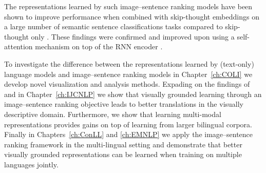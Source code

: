 
The representations learned by such image--sentence  ranking models have
been shown
to improve performance when combined with skip-thought embeddings
on a large number of semantic sentence classifications tasks compared to
skip-thought only \citep{kiela2017learning}. These findings were confirmed and improved upon using a
self-attention mechanism on top of the RNN encoder \citep{yoo2017improving}.

To investigate the difference between the representations learned by (text-only) language
models and image--sentence ranking models in Chapter~\ref{ch:COLI} we develop 
novel visualization and analysis methods.
Expading on the findings of \citep{kiela2017learning} and \citep{yoo2017improving} 
in Chapter~\ref{ch:IJCNLP} we show that
visually grounded learning through an image--sentence ranking objective 
leads to better translations in the visually descriptive domain. Furthermore,
we show that learning multi-modal representations provides gains on top of learning
from larger bilingual corpora.
Finally in Chapters~\ref{ch:ConLL} and \ref{ch:EMNLP} we apply the image--sentence ranking
framework \citep{vendrov2016order,faghri2017vse++} in the multi-lingual setting and demonstrate
that better visually grounded representations can be learned when training on multiple
languages jointly.





